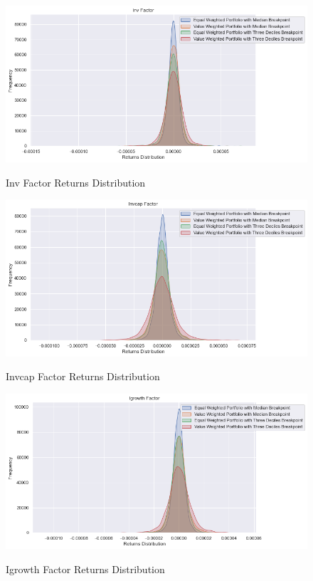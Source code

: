 \begin{figure}[H]
	\caption{Inv Factor Returns Distribution}
	\centering
	\includegraphics[scale=.63]{../../output/figures/inv.png}
	\label{fig:inv}
\end{figure}

\begin{figure}[H]
	\caption{Invcap Factor Returns Distribution}
	\centering
	\includegraphics[scale=.63]{../../output/figures/invcap.png}
	\label{fig:invcap}
\end{figure}

\begin{figure}[H]
	\caption{Igrowth Factor Returns Distribution}
	\centering
	\includegraphics[scale=.63]{../../output/figures/igrowth.png}
	\label{fig:igrowth}
\end{figure}

